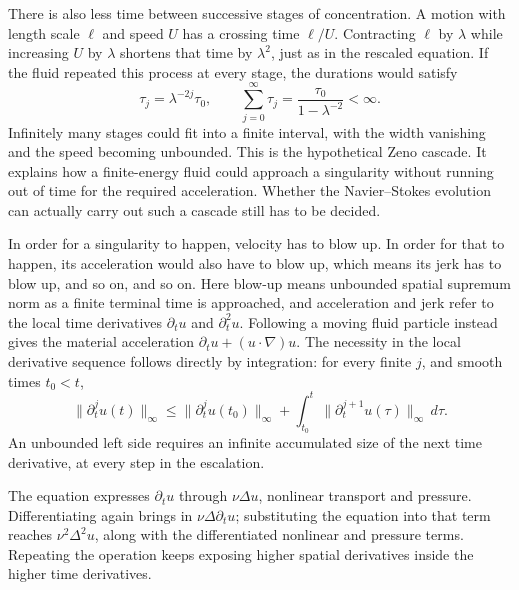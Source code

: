 There is also less time between successive stages of concentration. A motion
with length scale \(\ell\) and speed \(U\) has a crossing time \(\ell/U\).
Contracting \(\ell\) by \(\lambda\) while increasing \(U\) by \(\lambda\)
shortens that time by \(\lambda^2\), just as in the rescaled equation. If the
fluid repeated this process at every stage, the durations would satisfy
\[
 \tau_j=\lambda^{-2j}\tau_0,
 \qquad
 \sum_{j=0}^{\infty}\tau_j
 =\frac{\tau_0}{1-\lambda^{-2}}<\infty.
\]
Infinitely many stages could fit into a finite interval, with the width
vanishing and the speed becoming unbounded. This is the hypothetical Zeno
cascade. It explains how a finite-energy fluid could approach a singularity
without running out of time for the required acceleration. Whether the
Navier--Stokes evolution can actually carry out such a cascade still has to
be decided.

In order for a singularity to happen, velocity has to blow up. In order for
that to happen, its acceleration would also have to blow up, which means its
jerk has to blow up, and so on, and so on. Here blow-up means unbounded spatial
supremum norm as a finite terminal time is approached, and acceleration and
jerk refer to the local time derivatives \(\partial_tu\) and
\(\partial_t^2u\). Following a moving fluid particle instead gives the
material acceleration \(\partial_tu+(u\!\cdot\nabla)u\). The necessity in
the local derivative sequence follows directly by integration: for every
finite \(j\), and smooth times \(t_0<t\),
\[
 \|\partial_t^ju(t)\|_\infty
 \le \|\partial_t^ju(t_0)\|_\infty
   +\int_{t_0}^{t}\|\partial_t^{j+1}u(\tau)\|_\infty\,d\tau.
\]
An unbounded left side requires an infinite accumulated size of the next
time derivative, at every step in the escalation.

The equation expresses \(\partial_tu\) through \(\nu\Delta u\), nonlinear transport and
pressure. Differentiating again brings in \(\nu\Delta\partial_tu\); substituting
the equation into that term reaches \(\nu^2\Delta^2u\), along with the
differentiated nonlinear and pressure terms. Repeating the operation keeps
exposing higher spatial derivatives inside the higher time derivatives.

